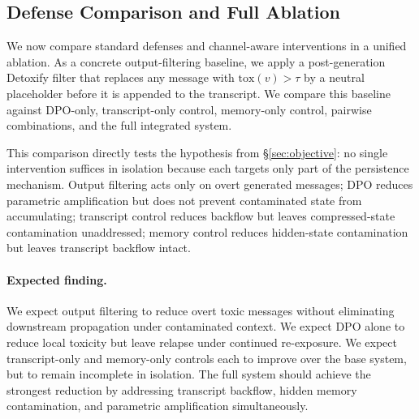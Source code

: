 
\subsection{Defense Comparison and Full Ablation}
\label{sec:results_defense_ablation}

We now compare standard defenses and channel-aware interventions in a unified ablation. As a concrete output-filtering baseline, we apply a post-generation Detoxify filter that replaces any message with $\mathrm{tox}(v)>\tau$ by a neutral placeholder before it is appended to the transcript. We compare this baseline against DPO-only, transcript-only control, memory-only control, pairwise combinations, and the full integrated system. 

This comparison directly tests the hypothesis from \S\ref{sec:objective}: no single intervention suffices in isolation because each targets only part of the persistence mechanism. Output filtering acts only on overt generated messages; DPO reduces parametric amplification but does not prevent contaminated state from accumulating; transcript control reduces backflow but leaves compressed-state contamination unaddressed; memory control reduces hidden-state contamination but leaves transcript backflow intact.

\paragraph{Expected finding.}
We expect output filtering to reduce overt toxic messages without eliminating downstream propagation under contaminated context. We expect DPO alone to reduce local toxicity but leave relapse under continued re-exposure. We expect transcript-only and memory-only controls each to improve over the base system, but to remain incomplete in isolation. The full system should achieve the strongest reduction by addressing transcript backflow, hidden memory contamination, and parametric amplification simultaneously. 

